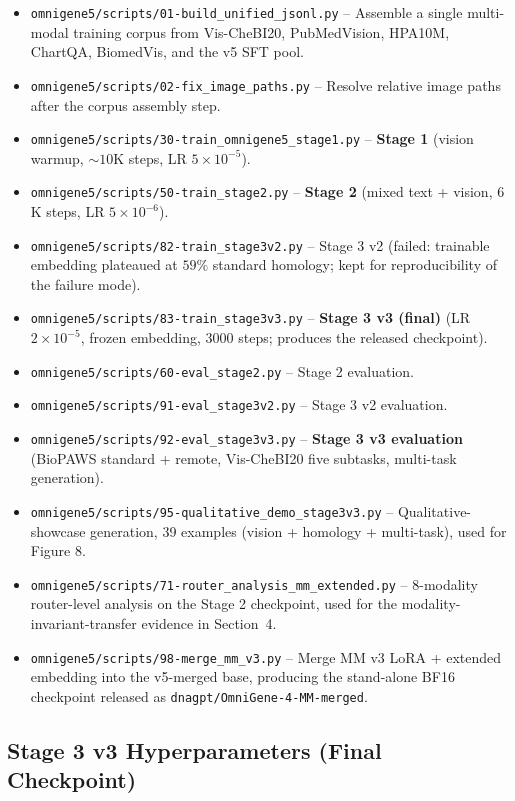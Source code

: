 \documentclass[11pt]{article}
\begin{document}
\begin{itemize}
\item \texttt{omnigene5/scripts/01-build\_unified\_jsonl.py} -- Assemble a single multi-modal training corpus from Vis-CheBI20, PubMedVision, HPA10M, ChartQA, BiomedVis, and the v5 SFT pool.
\item \texttt{omnigene5/scripts/02-fix\_image\_paths.py} -- Resolve relative image paths after the corpus assembly step.
\item \texttt{omnigene5/scripts/30-train\_omnigene5\_stage1.py} -- \textbf{Stage 1} (vision warmup, $\sim 10$K steps, LR $5\!\times\!10^{-5}$).
\item \texttt{omnigene5/scripts/50-train\_stage2.py} -- \textbf{Stage 2} (mixed text + vision, $6$K steps, LR $5\!\times\!10^{-6}$).
\item \texttt{omnigene5/scripts/82-train\_stage3v2.py} -- Stage 3 v2 (failed: trainable embedding plateaued at $59\%$ standard homology; kept for reproducibility of the failure mode).
\item \texttt{omnigene5/scripts/83-train\_stage3v3.py} -- \textbf{Stage 3 v3 (final)} (LR $2\!\times\!10^{-5}$, frozen embedding, $3000$ steps; produces the released checkpoint).
\item \texttt{omnigene5/scripts/60-eval\_stage2.py} -- Stage 2 evaluation.
\item \texttt{omnigene5/scripts/91-eval\_stage3v2.py} -- Stage 3 v2 evaluation.
\item \texttt{omnigene5/scripts/92-eval\_stage3v3.py} -- \textbf{Stage 3 v3 evaluation} (BioPAWS standard + remote, Vis-CheBI20 five subtasks, multi-task generation).
\item \texttt{omnigene5/scripts/95-qualitative\_demo\_stage3v3.py} -- Qualitative-showcase generation, 39 examples (vision + homology + multi-task), used for Figure 8.
\item \texttt{omnigene5/scripts/71-router\_analysis\_mm\_extended.py} -- 8-modality router-level analysis on the Stage 2 checkpoint, used for the modality-invariant-transfer evidence in Section~4.
\item \texttt{omnigene5/scripts/98-merge\_mm\_v3.py} -- Merge MM v3 LoRA + extended embedding into the v5-merged base, producing the stand-alone BF16 checkpoint released as \texttt{dnagpt/OmniGene-4-MM-merged}.
\end{itemize}

\subsection{Stage 3 v3 Hyperparameters (Final Checkpoint)}
\end{document}
